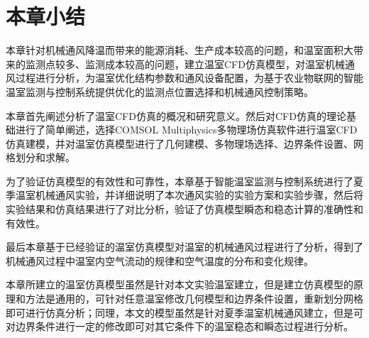 \section{本章小结}
本章针对机械通风降温而带来的能源消耗、生产成本较高的问题，和温室面积大带来的监测点较多、监测成本较高的问题，建立温室CFD仿真模型，对温室机械通风过程进行分析，为温室优化结构参数和通风设备配置，为基于农业物联网的智能温室监测与控制系统提供优化的监测点位置选择和机械通风控制策略。

本章首先阐述分析了温室CFD仿真的概况和研究意义。然后对CFD仿真的理论基础进行了简单阐述，选择COMSOL Multiphysics多物理场仿真软件进行温室CFD仿真建模，并对温室仿真模型进行了几何建模、多物理场选择、边界条件设置、网格划分和求解。

为了验证仿真模型的有效性和可靠性，本章基于智能温室监测与控制系统进行了夏季温室机械通风实验，并详细说明了本次通风实验的实验方案和实验步骤，然后将实验结果和仿真结果进行了对比分析，验证了仿真模型瞬态和稳态计算的准确性和有效性。

最后本章基于已经验证的温室仿真模型对温室的机械通风过程进行了分析，得到了机械通风过程中温室内空气流动的规律和空气温度的分布和变化规律。

本章所建立的温室仿真模型虽然是针对本文实验温室建立，但是建立仿真模型的原理和方法是通用的，可针对任意温室修改几何模型和边界条件设置，重新划分网格即可进行仿真分析；同理，本文的模型虽然是针对夏季温室机械通风建立，但是可对边界条件进行一定的修改即可对其它条件下的温室稳态和瞬态过程进行分析。